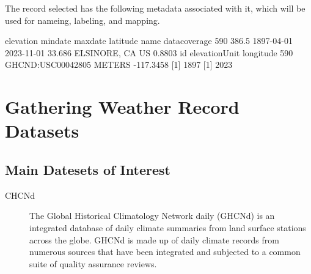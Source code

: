 \documentclass{article}
\begin{document}
\begin{itemize}
\begin{knitrout}
\begin{kframe}
\begin{alltt}
 \hlkwb{=} \hlstd{(}\hlstd{=}\hlstd{,}
                              \hlstd{=} \hlstd{,}
                              \hlstd{=} \hlstd{(}\hlstd{,} \hlstd{))}

 \hlkwb{=} \hlopt{$}
\hlstd{\}}


\hlopt{$} \hlkwb{<-} \hlstd{(}\hlstd{,} \hlopt{$}
\end{alltt}
\end{kframe}
\end{knitrout}

The record selected has the following metadata associated with it, which will be used for nameing, labeling, and mapping. 

    elevation    mindate    maxdate latitude            name datacoverage
590     386.5 1897-04-01 2023-11-01   33.686 ELSINORE, CA US       0.8803
                   id elevationUnit longitude
590 GHCND:USC00042805        METERS -117.3458
[1] 1897
[1] 2023


\section{Gathering Weather Record Datasets}

\subsection{Main Datesets of Interest}

\begin{description}

  \item[CHCNd]The Global Historical Climatology Network daily (GHCNd) is an integrated database of daily climate summaries from land surface stations across the globe. GHCNd is made up of daily climate records from numerous sources that have been integrated and subjected to a common suite of quality assurance reviews.
  

\end{description}
\end{itemize}
\end{document}
